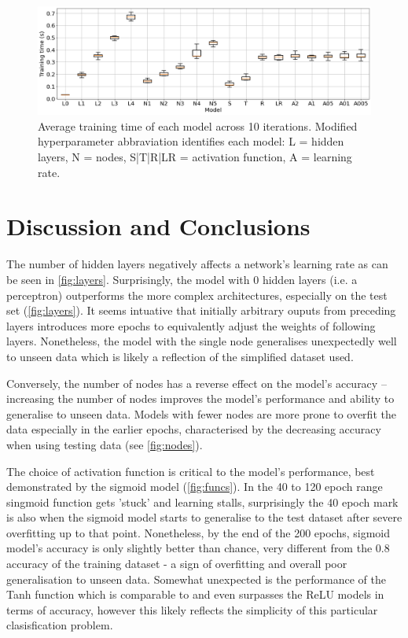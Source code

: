 \documentclass{article}
\begin{document}
\begin{figure}[H]
  \centering
  \includegraphics[width=\textwidth]{figs/times.png}
  \caption{
    Average training time of each model across 10 iterations.
    Modified hyperparameter abbraviation identifies each model:
    L = hidden layers, N = nodes, S|T|R|LR = activation function,
    A = learning rate.
  }
  \label{fig:times}
\end{figure}

\section{Discussion and Conclusions}

The number of hidden layers negatively affects a network's learning rate as can be seen in \ref{fig:layers}. Surprisingly, the model with 0 hidden layers (i.e. a perceptron) outperforms the more complex architectures, especially on the test set (\ref{fig:layers}). It seems intuative that initially arbitrary ouputs from preceding layers introduces more epochs to equivalently adjust the weights of following layers. Nonetheless, the model with the single node generalises unexpectedly well to unseen data which is likely a reflection of the simplified dataset used.

Conversely, the number of nodes has a reverse effect on the model's accuracy -- increasing the number of nodes improves the model's performance and ability to generalise to unseen data. Models with fewer nodes are more prone to overfit the data especially in the earlier epochs, characterised by the decreasing accuracy when using testing data (see \ref{fig:nodes}).

The choice of activation function is critical to the model's performance, best demonstrated by the sigmoid model (\ref{fig:funcs}). In the 40 to 120 epoch range singmoid function gets 'stuck' and learning stalls, surprisingly the 40 epoch mark is also when the sigmoid model starts to generalise to the test dataset after severe overfitting up to that point. Nonetheless, by the end of  the 200 epochs, sigmoid model's accuracy is only slightly better than chance, very different from the 0.8 accuracy of the training dataset - a sign of overfitting and overall poor generalisation to unseen data.
Somewhat unexpected is the performance of the Tanh function which is comparable to and even surpasses the ReLU models in terms of accuracy, however this likely reflects the simplicity of this particular clasisfication problem.
\end{document}
